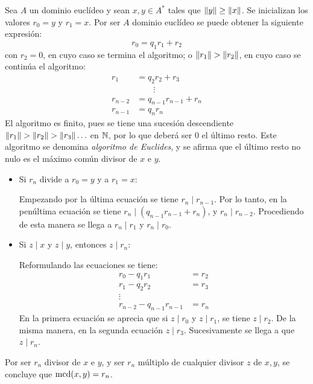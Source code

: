 \begin{prop}
    \item Sea $A$ un dominio euclídeo y sean $x,y\in A^*$ tales que $\|y\| \geq \|x\|$. Se inicializan los valores $r_0 = y$ y $r_1 = x$. Por ser $A$ dominio euclídeo se puede obtener la siguiente expresión: 
    \[
    r_0 = q_1r_1 + r_2
    \]
    con $r_2 = 0$, en cuyo caso se termina el algoritmo; o $\norm{r_1}> \norm{r_2}$, en cuyo caso se continúa el algoritmo:    \vspace{-0.5em}
        \begin{align*}
            r_1 &= q_2r_2 + r_3 \\
            &\quad \quad\vdots\\
            r_{n-2} &= q_{n-1}r_{n-1} + r_n\\
            r_{n-1} &= q_nr_n
        \end{align*} 
    El algoritmo es finito, pues se tiene una sucesión descendiente $\norm{r_1} > \norm{r_2}> \norm{r_3}\ldots$ en $\mathbb{N}$, por lo que deberá ser 0 el último resto. Este algoritmo se denomina \textit{algoritmo de Euclides}, y se afirma que el último resto no nulo es el máximo común divisor de $x$ e $y$.    
\end{prop}

\begin{dem}{\cite[p.~51]{GamboaAnillos}}
\begin{itemize}[label=--]
    \item Si $r_n$ divide a $r_0 = y$ y a $r_1 = x$:
    
    Empezando por la última ecuación se tiene $r_n \mid r_{n-1}$. Por lo tanto, en la penúltima ecuación se tiene $r_n\mid (q_{n-1}r_{n-1} + r_n)$, y $r_n\mid r_{n-2}$. Procediendo de esta manera se llega a $r_n \mid r_1$ y $r_n \mid r_0$.
    \item Si $z\mid x$ y $z\mid y$, entonces $z\mid r_n$:

    Reformulando las ecuaciones se tiene:\vspace{-0.3em}
    \begin{equation}
        \begin{aligned}
            r_0 - q_1r_1 \quad&=  r_2\\
            r_1 - q_2r_2\quad &=  r_3 \\
            \vdots\quad\quad\\
            r_{n-2}- q_{n-1}r_{n-1} &=  r_n
        \end{aligned}
    \tag{*}
    \label{ecEuclides_restos}
    \end{equation}
        En la primera ecuación se aprecia que si $z\mid r_0$ y $z\mid r_1$, se tiene $z\mid r_2$. De la misma manera, en la segunda ecuación $z\mid r_3$. Sucesivamente se llega a que $z\mid r_n$.
\end{itemize}
    \item Por ser $r_n$ divisor de $x$ e $y$, y ser $r_n$ múltiplo de cualquier divisor $z$ de $x,y$, se concluye que $\text{mcd}(x,y) = r_n$.        
\end{dem}

